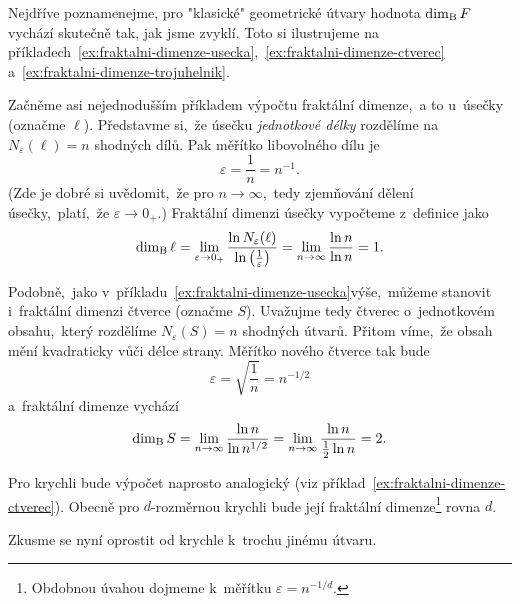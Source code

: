 Nejdříve poznamenejme, pro "klasické" geometrické útvary hodnota $\operatorname{dim_B}{F}$ vychází skutečně tak, jak jsme zvyklí. Toto si ilustrujeme na příkladech~\ref{ex:fraktalni-dimenze-usecka},~\ref{ex:fraktalni-dimenze-ctverec} a~\ref{ex:fraktalni-dimenze-trojuhelnik}.
\begin{example}\label{ex:fraktalni-dimenze-usecka}
    Začněme asi nejednodušším příkladem výpočtu fraktální dimenze,~a to u~úsečky (označme $\ell$). Představme si,~že úsečku \emph{jednotkové délky} rozdělíme na $N_\varepsilon(\ell)=n$ shodných dílů. Pak měřítko libovolného dílu je
    \[\varepsilon=\dfrac{1}{n}=n^{-1}.\]
    (Zde je dobré si uvědomit,~že pro $n\to\infty$,~tedy zjemňování dělení úsečky,~platí,~že $\varepsilon\to 0_+$.) Fraktální dimenzi úsečky vypočteme z~definice jako
    \[\operatorname{dim_B}{\ell}=\lim_{\varepsilon\to 0_+}{\dfrac{\ln{N_\varepsilon(\ell)}}{\ln{\left(\frac{1}{\varepsilon}\right)}}}=\lim_{n\to\infty}{\dfrac{\ln{n}}{\ln{n}}}=1.\]
\end{example}
\begin{example}\label{ex:fraktalni-dimenze-ctverec}
    Podobně,~jako v~příkladu~\ref{ex:fraktalni-dimenze-usecka}\linebreak{}výše,~můžeme stanovit i~fraktální dimenzi čtverce (označme $S$). Uvažujme tedy čtverec o~jednotkovém obsahu,~který rozdělíme $N_\varepsilon(S)=n$ shodných útvarů. Přitom víme,~že obsah mění kvadraticky vůči délce strany. Měřítko nového čtverce tak bude
    \[\varepsilon=\sqrt{\dfrac{1}{n}}=n^{-1/2}\]
    a~fraktální dimenze vychází
    \[\operatorname{dim_B}{S}=\lim_{n\to\infty}{\dfrac{\ln{n}}{\ln{n^{1/2}}}}=\lim_{n\to\infty}{\dfrac{\ln{n}}{\frac{1}{2}\ln{n}}}=2.\]
\end{example}
Pro krychli bude výpočet naprosto analogický (viz příklad~\ref{ex:fraktalni-dimenze-ctverec}). Obecně pro $d$-rozměrnou krychli bude její fraktální dimenze\footnote{Obdobnou úvahou dojmeme k~měřítku $\varepsilon=n^{-1/d}$.} rovna $d$.\par
Zkusme se nyní oprostit od krychle k~trochu jinému útvaru.
